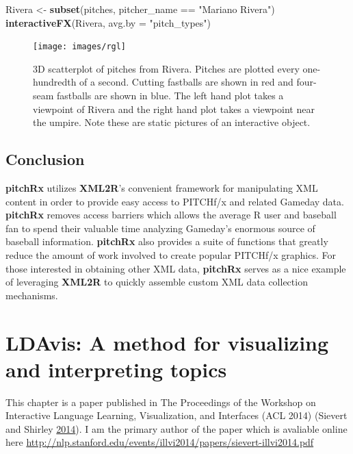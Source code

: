\documentclass[12pt,]{isuthesis}
\newenvironment{Shaded}{\begin{snugshade}}{\end{snugshade}}
\newcommand{\KeywordTok}[1]{\textcolor[rgb]{0.13,0.29,0.53}{\textbf{{#1}}}}
\newcommand{\DataTypeTok}[1]{\textcolor[rgb]{0.13,0.29,0.53}{{#1}}}
\newcommand{\StringTok}[1]{\textcolor[rgb]{0.31,0.60,0.02}{{#1}}}
\newcommand{\NormalTok}[1]{{#1}}
\begin{document}
\begin{Shaded}
\begin{Highlighting}[]
\NormalTok{Rivera <-}\StringTok{ }\KeywordTok{subset}\NormalTok{(pitches, pitcher_name ==}\StringTok{ "Mariano Rivera"}\NormalTok{)}
\KeywordTok{interactiveFX}\NormalTok{(Rivera, }\DataTypeTok{avg.by =} \StringTok{"pitch_types"}\NormalTok{)}
\end{Highlighting}
\end{Shaded}

\begin{figure}[htbp]
\centering
\texttt{[image: images/rgl]}
\caption{\label{fig:rgl}3D scatterplot of pitches from Rivera. Pitches are
plotted every one-hundredth of a second. Cutting fastballs are shown in
red and four-seam fastballs are shown in blue. The left hand plot takes
a viewpoint of Rivera and the right hand plot takes a viewpoint near the
umpire. Note these are static pictures of an interactive object.}
\end{figure}

\section{Conclusion}\label{conclusion}

\textbf{pitchRx} utilizes \textbf{XML2R}'s convenient framework for
manipulating XML content in order to provide easy access to PITCHf/x and
related Gameday data. \textbf{pitchRx} removes access barriers which
allows the average R user and baseball fan to spend their valuable time
analyzing Gameday's enormous source of baseball information.
\textbf{pitchRx} also provides a suite of functions that greatly reduce
the amount of work involved to create popular PITCHf/x graphics. For
those interested in obtaining other XML data, \textbf{pitchRx} serves as
a nice example of leveraging \textbf{XML2R} to quickly assemble custom
XML data collection mechanisms.

\chapter{LDAvis: A method for visualizing and interpreting topics}

This chapter is a paper published in The Proceedings of the Workshop on
Interactive Language Learning, Visualization, and Interfaces (ACL 2014)
(Sievert and Shirley \protect\hyperlink{ref-Sievert:2014b}{2014}). I am
the primary author of the paper which is avaliable online here
\url{http://nlp.stanford.edu/events/illvi2014/papers/sievert-illvi2014.pdf}
\end{document}
